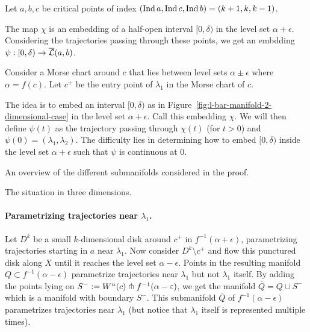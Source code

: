 \begin{myproof}
    Let $a,b,c$ be critical points of index $(\operatorname{Ind} a, \operatorname{Ind} c, \operatorname{Ind} b) = (k+1,k,k-1)$.
    \begin{marginfigure}
        \centering
        \caption{The map $\chi$ is an embedding of a half-open interval $[0, \delta)$ in the level set $\alpha+ \epsilon$. Considering the trajectories passing through these points, we get an embdding $\psi: [0, \delta) \to \overline{\mathcal L}(a, b)$.}
        \label{fig:l-bar-manifold-2-dimensional-case}
    \end{marginfigure}
    Consider a Morse chart around $c$ that lies between level sets $\alpha \pm \epsilon$ where  $\alpha = f(c)$.
    Let $c^{+}$ be the entry point of $\lambda_1$ in  the Morse chart of $c$.

    The idea is to embed an interval $[0, \delta)$ as in Figure~\ref{fig:l-bar-manifold-2-dimensional-case} in the level set $\alpha + \epsilon$. Call this embedding $\chi$.
    We will then define $\psi(t)$ as the trajectory passing through $\chi(t)$ (for $t>0$) and  $\psi(0) = (\lambda_1, \lambda_2)$.
    The difficulty lies in determining how to embed $[0, \delta)$ inside the level set $\alpha + \epsilon$ such that $\psi$ is continuous at  $0$.
    \begin{marginfigure}
        \centering
        \caption{An overview of the different submanifolds considered in the proof.}
        \label{fig:l-bar-manifold-2-dimensional-case-part-flow}
    \end{marginfigure}
\begin{marginfigure}
    \centering
    \caption{The situation in three dimensions.}
    \label{fig:lbar-manifold-three-dimensional-case}
\end{marginfigure}

\paragraph{Parametrizing trajectories near $\lambda_1$.}
Let $D^{k}$ be a small $k$-dimensional disk around $c^{+}$ in $f^{-1}(\alpha+\epsilon)$, parametrizing trajectories starting in $a$ near $\lambda_1$.
    Now consider $D^{k} \setminus c^{+}$ and flow this punctured disk along $X$ until it reaches the level set  $\alpha - \epsilon$.
    Points in the resulting manifold $Q \subset f^{-1}(\alpha - \epsilon)$ parametrize trajectories near $\lambda_1$ but not $\lambda_1$ itself.
    By adding the points lying on $S^{-} := W^u(c) \pitchfork f^{-1}(\alpha - \varepsilon)$, we get the manifold $\overline{Q} = Q \cup S^{-}$ which is a manifold with boundary $S^{-}$.
    This submanifold $\overline{Q}$ of $f^{-1}(\alpha-\epsilon)$ parametrizes trajectories near $\lambda_1$ (but notice that $\lambda_1$ itself is represented multiple times).



\end{myproof}
